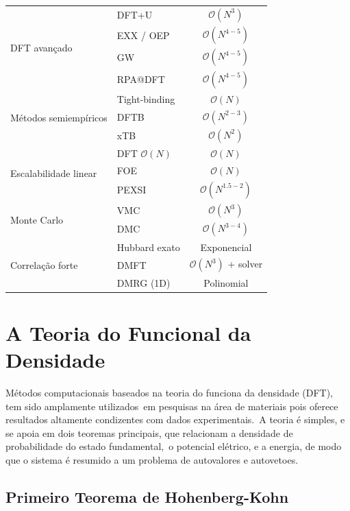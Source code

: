\begin{table}[H]
\begin{tabular}{l l c}
\hline
\multirow{4}{*}{DFT avançado}
& DFT+U & $\mathcal{O}(N^3)$ \\
& EXX / OEP & $\mathcal{O}(N^{4{-}5})$ \\
& GW & $\mathcal{O}(N^{4{-}5})$ \\
& RPA@DFT & $\mathcal{O}(N^{4{-}5})$ \\

\hline
\multirow{3}{*}{Métodos semiempíricos}
& Tight-binding & $\mathcal{O}(N)$ \\
& DFTB & $\mathcal{O}(N^{2{-}3})$ \\
& xTB & $\mathcal{O}(N^2)$ \\

\hline
\multirow{3}{*}{Escalabilidade linear}
& DFT $\mathcal{O}(N)$ & $\mathcal{O}(N)$ \\
& FOE & $\mathcal{O}(N)$ \\
& PEXSI & $\mathcal{O}(N^{1.5{-}2})$ \\

\hline
\multirow{2}{*}{Monte Carlo}
& VMC & $\mathcal{O}(N^3)$ \\
& DMC & $\mathcal{O}(N^{3{-}4})$ \\

\hline
\multirow{3}{*}{Correlação forte}
& Hubbard exato & Exponencial \\
& DMFT & $\mathcal{O}(N^3)$ + solver \\
& DMRG (1D) & Polinomial \\

\hline
\end{tabular}
\end{table}



\section{A Teoria do Funcional da Densidade}

Métodos computacionais baseados na teoria do funciona da densidade (DFT), tem sido amplamente utilizados\
em pesquisas na área de materiais pois oferece resultados altamente condizentes com dados experimentais.\
A teoria é simples, e se apoia em dois teoremas principais, que relacionam a densidade de probabilidade do estado fundamental,\
o potencial elétrico, e a energia, de modo que o sistema é resumido a um problema de autovalores e autovetoes.

\subsection{Primeiro Teorema de Hohenberg-Kohn}


